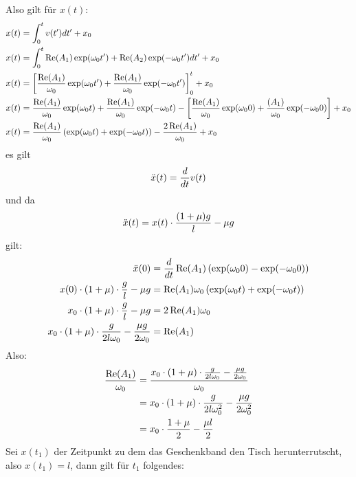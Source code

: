 \documentclass[sectionformat = exercise]{gadsescript}
\begin{document}
Also gilt für $ x(t) $:
\begin{align*}
	x(t) &= \int_{0}^{t}v(t^\prime) dt^\prime + x_0 \\
	x(t) &= \int_{0}^{t} \Real(A_1) \exp(\omega_0 t^\prime) + \Real(A_2) \exp(-\omega_0 t^\prime) dt^\prime + x_0\\
	x(t) &= \left[\frac{\Real(A_1)}{ \omega_0 }  \exp(\omega_0 t^\prime) + \frac{\Real(A_1)}{ \omega_0 } \exp(-\omega_0 t^\prime) \right]_{0}^{t}  + x_0\\
	x(t) &= \frac{\Real(A_1)}{ \omega_0 }  \exp(\omega_0 t) + \frac{\Real(A_1)}{ \omega_0 } \exp(-\omega_0 t) - \left[ \frac{\Real(A_1)}{ \omega_0 } \exp(\omega_0 0) + \frac{\real(A_1)}{ \omega_0 } \exp(-\omega_0 0) \right] + x_0\\
	x(t) &= \frac{\Real(A_1)}{ \omega_0 } \left( \exp(\omega_0 t) + \exp(-\omega_0 t) \right) - \frac{2\Real(A_1)}{ \omega_0 } + x_0\\
\end{align*}
es gilt
\[
	\ddot x(t) = \frac{ d }{ dt } v(t) \\
\]
und da 
\[
	\ddot x(t) = x(t) \cdot \frac{(1+\mu)g}{ l } - \mu g \\
\]
gilt:
\begin{align*}
	\ddot x(0) &= \frac{ d }{ dt } \operatorname{Re}(A_1) \left( \exp(\omega_0 0) - \exp(-\omega_0 0) \right) \\
	x(0) \cdot ( 1 + \mu) \cdot \frac{ g }{ l } - \mu g &= \operatorname{Re}(A_1)\omega_0 \left( \exp(\omega_0 t) + \exp(-\omega_0 t) \right) \\
	x_0 \cdot ( 1 + \mu) \cdot \frac{ g }{ l } - \mu g &= 2\operatorname{Re}(A_1)\omega_0 \\
	x_0 \cdot ( 1 + \mu) \cdot \frac{ g }{ 2l\omega_0 } - \frac{\mu g}{ 2\omega_0 }  &= \operatorname{Re}(A_1)\\
\end{align*}
Also:
\begin{align*}
	\frac{\operatorname{Re}(A_1)}{ \omega_0 } &= \frac{x_0 \cdot ( 1 + \mu) \cdot \frac{ g }{ 2l\omega_0 } - \frac{\mu g}{ 2\omega_0 }}{ \omega_0 } \\
	~ &= x_0 \cdot ( 1 + \mu) \cdot \frac{ g }{ 2l\omega_0^2 } - \frac{\mu g}{ 2\omega_0^2 } \\
	~ &= x_0 \cdot \frac{ 1 + \mu }{ 2 } - \frac{\mu l}{ 2 } \\
\end{align*}
Sei $ x(t_1) $ der Zeitpunkt zu dem das Geschenkband den Tisch herunterrutscht, also $ x(t_1) = l $, dann gilt für $ t_1 $ folgendes:
\end{document}
